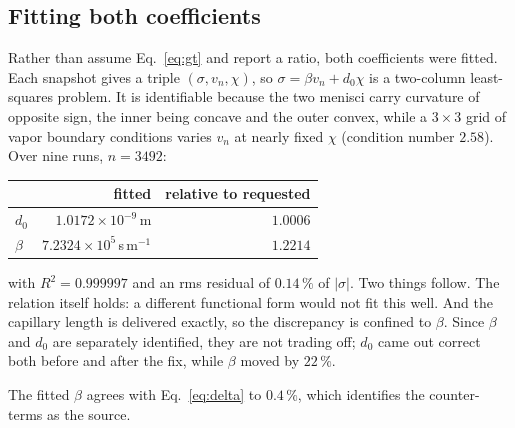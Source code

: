 \documentclass[11pt,a4paper]{article}
\newcommand{\vn}{v_n}
\begin{document}
\subsection{Fitting both coefficients}
Rather than assume Eq.~\eqref{eq:gt} and report a ratio, both coefficients were fitted.
Each snapshot gives a triple $(\sigma,\vn,\chi)$, so
$\sigma=\beta\vn+d_0\chi$ is a two-column least-squares problem. It is identifiable
because the two menisci carry curvature of opposite sign, the inner being concave and the
outer convex, while a $3\times3$ grid of vapor boundary conditions varies $\vn$ at nearly
fixed $\chi$ (condition number $2.58$). Over nine runs, $n=3492$:
\begin{center}\small\begin{tabular}{lrr}\toprule
 & fitted & relative to requested\\ \midrule
$d_0$   & $1.0172\times10^{-9}$\,m       & $1.0006$\\
$\beta$ & $7.2324\times10^{5}$\,s\,m$^{-1}$ & $1.2214$\\ \bottomrule
\end{tabular}\end{center}
with $R^2=0.999997$ and an rms residual of $0.14\,\%$ of $|\sigma|$. Two things follow.
The relation itself holds: a different functional form would not fit this well. And the
capillary length is delivered exactly, so the discrepancy is confined to $\beta$. Since
$\beta$ and $d_0$ are separately identified, they are not trading off; $d_0$ came out
correct both before and after the fix, while $\beta$ moved by $22\,\%$.

The fitted $\beta$ agrees with Eq.~\eqref{eq:delta} to $0.4\,\%$, which identifies the
counter-terms as the source.
\end{document}
